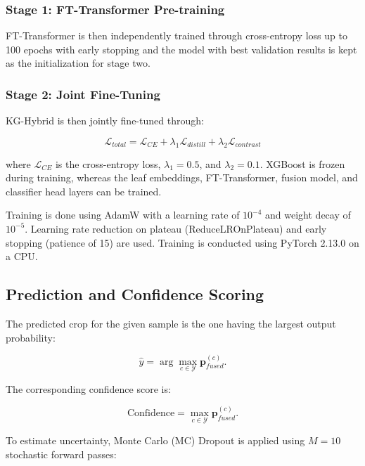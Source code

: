 \documentclass[journal]{IEEEtran}
\begin{document}
\subsubsection{Stage 1: FT-Transformer Pre-training}

FT-Transformer is then independently trained through cross-entropy loss up to 100 epochs with early stopping and the model with best validation results is kept as the initialization for stage two.

\subsubsection{Stage 2: Joint Fine-Tuning}

KG-Hybrid is then jointly fine-tuned through:

\begin{equation}
\mathcal{L}_{total} =
\mathcal{L}_{CE}
+
\lambda_1\mathcal{L}_{distill}
+
\lambda_2\mathcal{L}_{contrast}
\end{equation}

where $\mathcal{L}_{CE}$ is the cross-entropy loss, $\lambda_1=0.5$, and $\lambda_2=0.1$. XGBoost is frozen during training, whereas the leaf embeddings, FT-Transformer, fusion model, and classifier head layers can be trained.

Training is done using AdamW with a learning rate of $10^{-4}$ and weight decay of $10^{-5}$. Learning rate reduction on plateau (ReduceLROnPlateau) and early stopping (patience of 15) are used. Training is conducted using PyTorch 2.13.0 on a CPU.

\subsection{Prediction and Confidence Scoring}

The predicted crop for the given sample is the one having the largest output probability:

\begin{equation}
\hat{y} =
\arg\max_{c\in\mathcal{Y}}
\mathbf{p}_{fused}^{(c)}.
\end{equation}

The corresponding confidence score is:

\begin{equation}
\text{Confidence} =
\max_{c\in\mathcal{Y}}
\mathbf{p}_{fused}^{(c)}.
\end{equation}

To estimate uncertainty, Monte Carlo (MC) Dropout is applied using $M=10$ stochastic forward passes:
\end{document}
